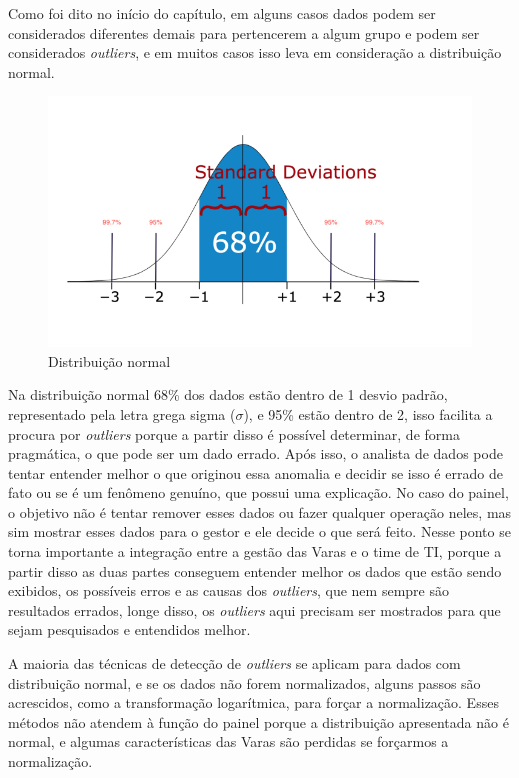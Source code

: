 Como foi dito no início do capítulo, em alguns casos dados podem ser considerados diferentes demais para pertencerem a algum grupo e podem ser considerados \textit{outliers}, e em muitos casos isso leva em consideração a distribuição normal. 

\begin{figure}[h]
	\centering
	\includegraphics[scale=0.50]{./figures/cap3/dist_normal.png}
	\caption{Distribuição normal}
\end{figure}

Na distribuição normal 68\% dos dados estão dentro de 1 desvio padrão, representado pela letra grega sigma ($\sigma$), e 95\% estão dentro de 2, isso facilita a procura por \textit{outliers} porque a partir disso é possível determinar, de forma pragmática, o que pode ser um dado errado. Após isso, o analista de dados pode tentar entender melhor o que originou essa anomalia e decidir se isso é errado de fato ou se é um fenômeno genuíno, que possui uma explicação. No caso do painel, o objetivo não é tentar remover esses dados ou fazer qualquer operação neles, mas sim mostrar esses dados para o gestor e ele decide o que será feito. Nesse ponto se torna importante a integração entre a gestão das Varas e o time de TI, porque a partir disso as duas partes conseguem entender melhor os dados que estão sendo exibidos, os possíveis erros e as  causas dos \textit{outliers}, que nem sempre são resultados errados, longe disso, os \textit{outliers} aqui precisam ser mostrados para que sejam pesquisados e entendidos melhor.

A maioria das técnicas de detecção de \textit{outliers} se aplicam para dados com distribuição normal, e se os dados não forem normalizados, alguns passos são acrescidos, como a transformação logarítmica, para forçar a normalização. Esses métodos não atendem à função do painel porque a distribuição apresentada não é normal, e algumas características das Varas são perdidas se forçarmos a normalização.

